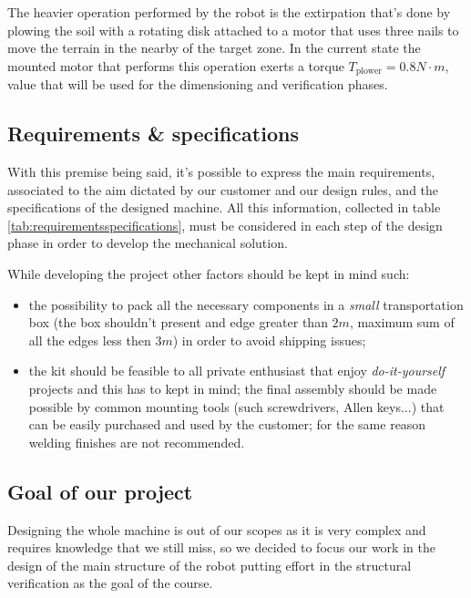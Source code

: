 	The heavier operation performed by the robot is the extirpation that's done by plowing the soil with a rotating disk attached to a motor that uses three nails to move the terrain in the nearby of the target zone. In the current state the mounted motor that performs this operation exerts a torque $T_\textrm{plower} = 0.8 N\cdot m$, value that will be used for the dimensioning and verification phases.

	
	\subsection{Requirements \& specifications}
		With this premise being said, it's possible to express the main requirements, associated to the aim dictated by our customer and our design rules, and the specifications of the designed machine. All this information, collected in table \ref{tab:requirementsspecifications}, must be considered in each step of the design phase in order to develop the mechanical solution.
		
		
		
		While developing the project other factors should be kept in mind such:
		\begin{itemize}
			\item the possibility to pack all the necessary components in a \textit{small} transportation box (the box shouldn't present and edge greater than $2m$, maximum sum of all the edges less then $3m$) in order to avoid shipping issues;
			
			\item the kit should be feasible to all private enthusiast that enjoy \textit{do-it-yourself} projects and this has to kept in mind; the final assembly should be made possible by common mounting tools (such screwdrivers, Allen keys...) that can be easily purchased and used by the customer; for the same reason welding finishes are not recommended.
		\end{itemize}
	
	\subsection{Goal of our project}
		Designing the whole machine is out of our scopes as it is very complex and requires knowledge that we still miss, so we decided to focus our work in the design of the main structure of the robot putting effort in the structural verification as the goal of the course.
	
	
	
	
	
	
	
	
	
	
	
	
	
	
	
	
	
	
	
	
	
	
	